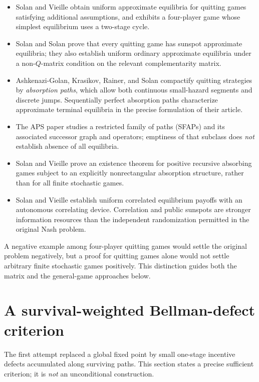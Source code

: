 \documentclass[11pt,a4paper]{article}
\theoremstyle{definition}
\theoremstyle{remark}
\begin{document}
\begin{itemize}[leftmargin=*]
\item Solan and Vieille \cite{sv2001} obtain uniform approximate equilibria for quitting games satisfying additional assumptions, and \cite{sv2002example} exhibits a four-player game whose simplest equilibrium uses a two-stage cycle.
\item Solan and Solan \cite{solansolan2020} prove that every quitting game has sunspot approximate equilibria; they also establish uniform ordinary approximate equilibria under a non-$Q$-matrix condition on the relevant complementarity matrix.
\item Ashkenazi-Golan, Krasikov, Rainer, and Solan \cite{akrs2024} compactify quitting strategies by \emph{absorption paths}, which allow both continuous small-hazard segments and discrete jumps. Sequentially perfect absorption paths characterize approximate terminal equilibria in the precise formulation of their article.
\item The APS paper \cite{aps2026} studies a restricted family of paths (SFAPs) and its associated successor graph and operators; emptiness of that subclass does \emph{not} establish absence of all equilibria.
\item Solan and Vieille \cite{sv2025} prove an existence theorem for positive recursive absorbing games subject to an explicitly nonrectangular absorption structure, rather than for all finite stochastic games.
\item Solan and Vieille \cite{solanvieille2002corr} establish uniform correlated equilibrium payoffs with an autonomous correlating device. Correlation and public sunspots are stronger information resources than the independent randomization permitted in the original Nash problem.
\end{itemize}

A negative example among four-player quitting games would settle the original problem negatively, but a proof for quitting games alone would not settle arbitrary finite stochastic games positively. This distinction guides both the matrix and the general-game approaches below.

\section{A survival-weighted Bellman-defect criterion}\label{sec:weighted}
The first attempt replaced a global fixed point by small one-stage incentive defects accumulated along surviving paths. This section states a precise sufficient criterion; it is \emph{not} an unconditional construction.
\end{document}
